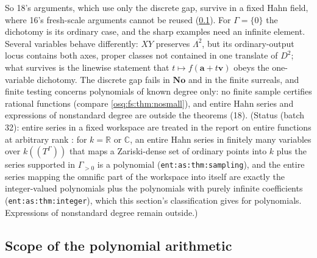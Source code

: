 \documentclass[11pt,letterpaper]{article}
\numberwithin{equation}{section}
\theoremstyle{definition}
\theoremstyle{remark}
\theoremstyle{plain}
\newcommand{\No}{\mathbf{No}}
\newcommand{\R}{\mathbb R}
\newcommand{\C}{\mathbb C}
\begin{document}
So 18's arguments, which use only the discrete gap, survive in a fixed Hahn field, where 16's fresh-scale arguments cannot be reused
(\cref{osq:pm:sub:scope}). For $\Gamma=\{0\}$ the dichotomy is its ordinary case, and the sharp examples need an infinite element. Several variables behave
differently: $XY$ preserves $\Lambda^2$, but its ordinary-output locus contains both axes, proper classes not contained in one translate of $D^2$; what
survives is the linewise statement that $t\mapsto f(\mathbf a+t\mathbf v)$ obeys the one-variable dichotomy. The discrete gap fails in $\No$ and in the
finite surreals, and finite testing concerns polynomials of known degree only: no finite sample certifies rational functions (compare
\cref{osq:fs:thm:nosmall}), and entire Hahn series and expressions of nonstandard degree are outside the theorems (18).
(Status (batch 32): entire series in a fixed workspace are treated in the report on entire functions at arbitrary
rank \cite{RepoEnt}: for $k=\R$ or $\C$, an entire Hahn series in finitely many variables over $k(\!(T^\Gamma)\!)$ that
maps a Zariski-dense set of ordinary points into $k$ plus the series supported in $\Gamma_{>0}$ is a polynomial (\nolinkurl{ent:as:thm:sampling}), and
the entire series mapping the omnific part of the workspace into itself are exactly the integer-valued polynomials
plus the polynomials with purely infinite coefficients (\nolinkurl{ent:as:thm:integer}), which this section's
classification gives for polynomials. Expressions of nonstandard degree remain outside.)

\subsection{Scope of the polynomial arithmetic}\label{osq:pm:sub:scope}
\end{document}

